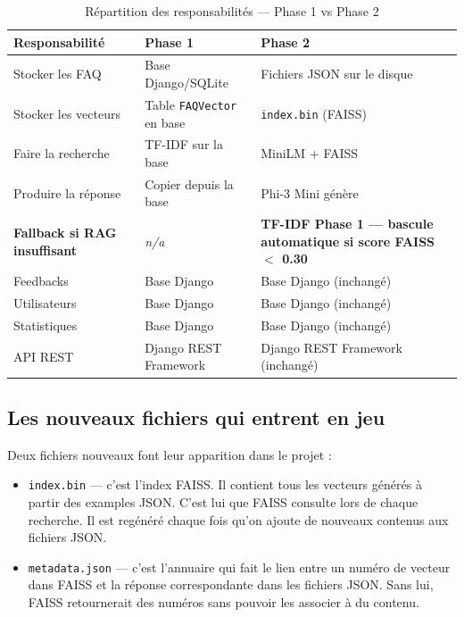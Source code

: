 \documentclass[11pt,a4paper]{article}
\begin{document}
\begin{table}[H]
\centering
\begin{tabularx}{\textwidth}{|l|X|X|}
\hline
\textbf{Responsabilité} & \textbf{Phase 1} & \textbf{Phase 2} \\
\hline
Stocker les FAQ & Base Django/SQLite & Fichiers JSON sur le disque \\
\hline
Stocker les vecteurs & Table \texttt{FAQVector} en base & \texttt{index.bin} (FAISS) \\
\hline
Faire la recherche & TF-IDF sur la base & MiniLM + FAISS \\
\hline
Produire la réponse & Copier depuis la base & Phi-3 Mini génère \\
\hline
\textbf{Fallback si RAG insuffisant} & \textit{n/a} &
\textbf{TF-IDF Phase 1 --- bascule automatique si score FAISS $<$ 0.30} \\
\hline
Feedbacks & Base Django & Base Django (inchangé) \\
\hline
Utilisateurs & Base Django & Base Django (inchangé) \\
\hline
Statistiques & Base Django & Base Django (inchangé) \\
\hline
API REST & Django REST Framework & Django REST Framework (inchangé) \\
\hline
\end{tabularx}
\caption{Répartition des responsabilités --- Phase 1 vs Phase 2}
\end{table}

\subsection{Les nouveaux fichiers qui entrent en jeu}

Deux fichiers nouveaux font leur apparition dans le projet :

\begin{itemize}
    \item \texttt{index.bin} --- c'est l'index FAISS. Il contient
    tous les vecteurs générés à partir des examples JSON.
    C'est lui que FAISS consulte lors de chaque recherche.
    Il est regénéré chaque fois qu'on ajoute de nouveaux
    contenus aux fichiers JSON.

    \item \texttt{metadata.json} --- c'est l'annuaire qui fait
    le lien entre un numéro de vecteur dans FAISS et la réponse
    correspondante dans les fichiers JSON. Sans lui, FAISS
    retournerait des numéros sans pouvoir les associer à du contenu.
\end{itemize}
\end{document}
